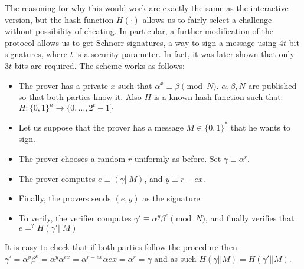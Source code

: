 \documentclass{article}
\begin{document}
The reasoning for why this would work are exactly the same as the interactive version, but the hash function 
$H(\cdot)$ allows us to fairly select a challenge without possibility of cheating. In particular, a further 
modification of the protocol allows us to get Schnorr signatures, a way to sign a message using $4t$-bit signatures,
where $t$ is a security parameter. In fact, it was later shown \cite{nevenHashFunctionRequirements2009} that only $3t$-bits 
are required. The scheme works as follows:
\begin{itemize}
    \item The prover has a private $x$ such that $\alpha^x \equiv \beta \pmod N$. $\alpha, \beta, N$ 
          are published so that both parties know it. Also $H$ is a known hash function such that: $H: \{0, 1\}^n \to \{0, \dots, 2^t - 1\}$
    \item Let us suppose that the prover has a message $M \in \{0, 1 \}^*$ that he wants to sign. 
    \item The prover chooses a random $r$ uniformly as before. Set $\gamma \equiv \alpha^r$.
    \item The prover computes $e \equiv (\gamma || M)$, and $y \equiv r - ex$.
    \item Finally, the provers sends $(e, y)$ as the signature
    \item To verify, the verifier computes $\gamma' \equiv \alpha^y \beta^e \pmod N$, and finally 
          verifies that $e =^? H(\gamma' || M)$
\end{itemize}

It is easy to check that if both parties follow the procedure then 
$\gamma' = \alpha^y \beta ^e = \alpha^y \alpha^{ex} = \alpha^{r - ex} \alpha{ex} = \alpha^r = \gamma$
and as such $H(\gamma || M) = H(\gamma' || M)$.
\end{document}
